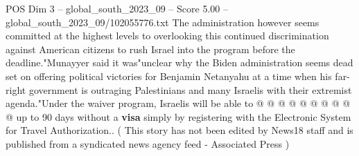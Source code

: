 \begin{textsample}{POS Dim 3 – global\_south\_2023\_09 – Score 5.00 – global\_south\_2023\_09/102055776.txt}
The administration however seems committed at the highest levels to overlooking this continued discrimination against American citizens to rush Israel into the program before the deadline."Munayyer said it was"unclear why the Biden administration seems dead set on offering political victories for Benjamin Netanyahu at a time when his far-right government is outraging Palestinians and many Israelis with their extremist agenda."Under the waiver program, Israelis will be able to @ @ @ @ @ @ @ @ @ @ up to 90 days without a \textbf{visa} simply by registering with the Electronic System for Travel Authorization.. ( This story has not been edited by News18 staff and is published from a syndicated news agency feed - Associated Press )

\end{textsample}
